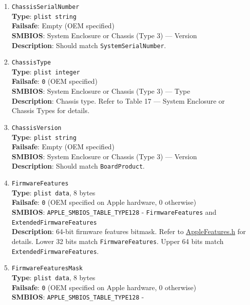 \documentclass[]{article}
\begin{document}
\begin{enumerate}
  \texttt{SystemManufacturer} do apply.
\item
  \texttt{ChassisSerialNumber}\\
  \textbf{Type}: \texttt{plist\ string}\\
  \textbf{Failsafe}: Empty (OEM specified)\\
  \textbf{SMBIOS}: System Enclosure or Chassis (Type 3) --- Version\\
  \textbf{Description}: Should match \texttt{SystemSerialNumber}.
\item
  \texttt{ChassisType}\\
  \textbf{Type}: \texttt{plist\ integer}\\
  \textbf{Failsafe}: \texttt{0} (OEM specified)\\
  \textbf{SMBIOS}: System Enclosure or Chassis (Type 3) --- Type\\
  \textbf{Description}: Chassis type. Refer to Table 17 --- System
  Enclosure or Chassis Types for details.
\item
  \texttt{ChassisVersion}\\
  \textbf{Type}: \texttt{plist\ string}\\
  \textbf{Failsafe}: Empty (OEM specified)\\
  \textbf{SMBIOS}: System Enclosure or Chassis (Type 3) --- Version\\
  \textbf{Description}: Should match \texttt{BoardProduct}.
\item
  \texttt{FirmwareFeatures}\\
  \textbf{Type}: \texttt{plist\ data}, 8 bytes\\
  \textbf{Failsafe}: \texttt{0} (OEM specified on Apple hardware, 0 otherwise)\\
  \textbf{SMBIOS}: \texttt{APPLE\_SMBIOS\_TABLE\_TYPE128} -
  \texttt{FirmwareFeatures} and \texttt{ExtendedFirmwareFeatures}\\
  \textbf{Description}: 64-bit firmware features bitmask. Refer to
  \href{https://github.com/acidanthera/OpenCorePkg/blob/master/Include/Apple/IndustryStandard/AppleFeatures.h}{AppleFeatures.h}
  for details. Lower 32 bits match \texttt{FirmwareFeatures}. Upper
  64 bits match \texttt{ExtendedFirmwareFeatures}.
\item
  \texttt{FirmwareFeaturesMask}\\
  \textbf{Type}: \texttt{plist\ data}, 8 bytes\\
  \textbf{Failsafe}: \texttt{0} (OEM specified on Apple hardware, 0 otherwise)\\
  \textbf{SMBIOS}: \texttt{APPLE\_SMBIOS\_TABLE\_TYPE128} -

\end{enumerate}
\end{document}
